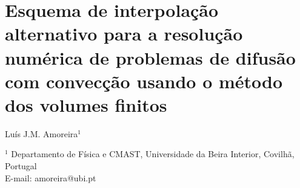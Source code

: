 \documentclass[11pt,twoside]{article}
\begin{document}

\section*{
    Esquema de interpolação alternativo para a reso\-lução numérica de
problemas de difusão com convecção usando o método dos volumes finitos
}

\vspace{10pt}


Luís J.M. Amoreira$^{1}$%

\vspace{10pt}



{
\center

    \footnotesize

$^{1}$ Departamento de Física e CMAST, Universidade da Beira Interior, Covilhã, 
Portugal \\
E-mail: amoreira@ubi.pt

%
%
%
%
}

\vspace{25pt}

\end{document}
